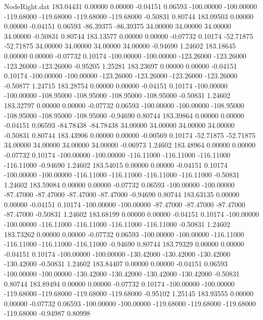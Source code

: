 \begin{filecontents}{NodeRight.dat}
 183.04431    0.00000    0.00000    -0.04151    0.06593 -100.00000 -100.00000 -119.68000 -119.68000 -119.68000 -119.68000   -0.50831    0.80744
 183.09503    0.00000    0.00000    -0.04151    0.06593  -86.39375  -86.39375   34.00000   34.00000   34.00000   34.00000   -0.50831    0.80744
 183.13577    0.00000    0.00000    -0.07732    0.10174  -52.71875  -52.71875   34.00000   34.00000   34.00000   34.00000   -0.94690    1.24602
 183.18645    0.00000    0.00000    -0.07732    0.10174 -100.00000 -100.00000 -123.26000 -123.26000 -123.26000 -123.26000   -0.95205    1.25281
 183.23697    0.00000    0.00000    -0.04151    0.10174 -100.00000 -100.00000 -123.26000 -123.26000 -123.26000 -123.26000   -0.50877    1.24715
 183.28754    0.00000    0.00000    -0.04151    0.10174 -100.00000 -100.00000 -108.95000 -108.95000 -108.95000 -108.95000   -0.50831    1.24602
 183.32797    0.00000    0.00000    -0.07732    0.06593 -100.00000 -100.00000 -108.95000 -108.95000 -108.95000 -108.95000   -0.94690    0.80744
 183.39864    0.00000    0.00000    -0.04151    0.06593  -84.78438  -84.78438   34.00000   34.00000   34.00000   34.00000   -0.50831    0.80744
 183.43906    0.00000    0.00000    -0.00569    0.10174  -52.71875  -52.71875   34.00000   34.00000   34.00000   34.00000   -0.06973    1.24602
 183.48964    0.00000    0.00000    -0.07732    0.10174 -100.00000 -100.00000 -116.11000 -116.11000 -116.11000 -116.11000   -0.94690    1.24602
 183.54015    0.00000    0.00000    -0.04151    0.10174 -100.00000 -100.00000 -116.11000 -116.11000 -116.11000 -116.11000   -0.50831    1.24602
 183.59084    0.00000    0.00000    -0.07732    0.06593 -100.00000 -100.00000  -87.47000  -87.47000  -87.47000  -87.47000   -0.94690    0.80744
 183.63135    0.00000    0.00000    -0.04151    0.10174 -100.00000 -100.00000  -87.47000  -87.47000  -87.47000  -87.47000   -0.50831    1.24602
 183.68199    0.00000    0.00000    -0.04151    0.10174 -100.00000 -100.00000 -116.11000 -116.11000 -116.11000 -116.11000   -0.50831    1.24602
 183.73262    0.00000    0.00000    -0.07732    0.06593 -100.00000 -100.00000 -116.11000 -116.11000 -116.11000 -116.11000   -0.94690    0.80744
 183.79329    0.00000    0.00000    -0.04151    0.10174 -100.00000 -100.00000 -130.42000 -130.42000 -130.42000 -130.42000   -0.50831    1.24602
 183.84407    0.00000    0.00000    -0.04151    0.06593 -100.00000 -100.00000 -130.42000 -130.42000 -130.42000 -130.42000   -0.50831    0.80744
 183.89494    0.00000    0.00000    -0.07732    0.10174 -100.00000 -100.00000 -119.68000 -119.68000 -119.68000 -119.68000   -0.95102    1.25145
 183.93555    0.00000    0.00000    -0.07732    0.06593 -100.00000 -100.00000 -119.68000 -119.68000 -119.68000 -119.68000   -0.94987    0.80998

\end{filecontents}
